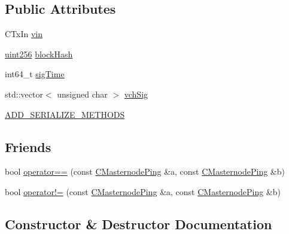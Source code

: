 \subsection*{Public Attributes}
\begin{DoxyCompactItemize}
\item 
C\+Tx\+In \mbox{\hyperlink{class_c_masternode_ping_a571b8eea88a8e3a0875780e1652db23a}{vin}}
\item 
\mbox{\hyperlink{classuint256}{uint256}} \mbox{\hyperlink{class_c_masternode_ping_a79701d12b8043278f5054ac2bbdc1634}{block\+Hash}}
\item 
int64\+\_\+t \mbox{\hyperlink{class_c_masternode_ping_a6f34bac31f77da61a9584a09b3af7b9e}{sig\+Time}}
\item 
std\+::vector$<$ unsigned char $>$ \mbox{\hyperlink{class_c_masternode_ping_a37901b2eeef5ee740e55f3c038b35a15}{vch\+Sig}}
\item 
\mbox{\hyperlink{class_c_masternode_ping_acc0c4885f3e128b03d5638b077dbd864}{A\+D\+D\+\_\+\+S\+E\+R\+I\+A\+L\+I\+Z\+E\+\_\+\+M\+E\+T\+H\+O\+DS}}
\end{DoxyCompactItemize}
\subsection*{Friends}
\begin{DoxyCompactItemize}
\item 
bool \mbox{\hyperlink{class_c_masternode_ping_aabbc8547aea2e228bf850e91ddaa8cc9}{operator==}} (const \mbox{\hyperlink{class_c_masternode_ping}{C\+Masternode\+Ping}} \&a, const \mbox{\hyperlink{class_c_masternode_ping}{C\+Masternode\+Ping}} \&b)
\item 
bool \mbox{\hyperlink{class_c_masternode_ping_ad2ecef1cf1f957d3002842b396652028}{operator!=}} (const \mbox{\hyperlink{class_c_masternode_ping}{C\+Masternode\+Ping}} \&a, const \mbox{\hyperlink{class_c_masternode_ping}{C\+Masternode\+Ping}} \&b)
\end{DoxyCompactItemize}


\subsection{Constructor \& Destructor Documentation}
\mbox{\label{class_c_masternode_ping_a52dbadac47e4e65cba0735ef7fd1e6e0}} 
